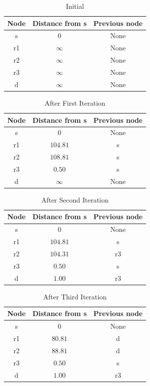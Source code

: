 \documentclass[conference]{IEEEtran}
\begin{document}
\begin{table}[H]
\centering
\caption{Initial}
\label{my-label1}
\begin{tabular}{|c|c|c|}
\hline
\textbf{Node}&\textbf{Distance from s}&\textbf{Previous node}\\ \hline
s&$0$&None\\ \hline
r1&$\infty$&None\\ \hline
r2&$\infty$&None\\ \hline
r3&$\infty$&None\\ \hline
d&$\infty$&None\\ \hline
\end{tabular}
\end{table}


\begin{table}[H]
\centering
\caption{After First Iteration}
\label{my-label1}
\begin{tabular}{|c|c|c|}
\hline
\textbf{Node}&\textbf{Distance from s}&\textbf{Previous node}\\ \hline
s&$0$&None\\ \hline
r1&$104.81$&s\\ \hline
r2&$108.81$&s\\ \hline
r3&$0.50$&s\\ \hline
d&$\infty$&None\\ \hline
\end{tabular}
\end{table}


\begin{table}[H]
\centering
\caption{After Second Iteration}
\label{my-label1}
\begin{tabular}{|c|c|c|}
\hline
\textbf{Node}&\textbf{Distance from s}&\textbf{Previous node}\\ \hline
s&$0$&None\\ \hline
r1&$104.81$&s\\ \hline
r2&$104.31$&r3\\ \hline
r3&$0.50$&s\\ \hline
d&$1.00$&r3\\ \hline
\end{tabular}
\end{table}


\begin{table}[H]
\centering
\caption{After Third Iteration}
\label{my-label1}
\begin{tabular}{|c|c|c|}
\hline
\textbf{Node}&\textbf{Distance from s}&\textbf{Previous node}\\ \hline
s&$0$&None\\ \hline
r1&$80.81$&d\\ \hline
r2&$88.81$&d\\ \hline
r3&$0.50$&s\\ \hline
d&$1.00$&r3\\ \hline
\end{tabular}
\end{table}
\end{document}

